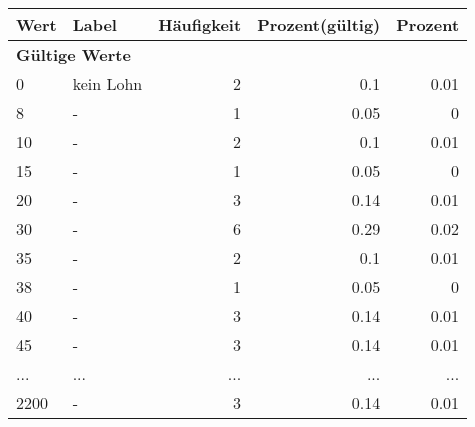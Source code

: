      \begin{longtable}{lXrrr}
     \toprule
     \textbf{Wert} & \textbf{Label} & \textbf{Häufigkeit} & \textbf{Prozent(gültig)} & \textbf{Prozent} \\
     \endhead
     \midrule
     \multicolumn{5}{l}{\textbf{Gültige Werte}}\\
        0 & \multicolumn{1}{X}{kein Lohn} & %
          \num{2} &
          \num[round-mode=places,round-precision=2]{0.1} &
          \num[round-mode=places,round-precision=2]{0.01} \\
        8 & \multicolumn{1}{X}{-} & %
          \num{1} &
          \num[round-mode=places,round-precision=2]{0.05} &
          \num[round-mode=places,round-precision=2]{0} \\
        10 & \multicolumn{1}{X}{-} & %
          \num{2} &
          \num[round-mode=places,round-precision=2]{0.1} &
          \num[round-mode=places,round-precision=2]{0.01} \\
        15 & \multicolumn{1}{X}{-} & %
          \num{1} &
          \num[round-mode=places,round-precision=2]{0.05} &
          \num[round-mode=places,round-precision=2]{0} \\
        20 & \multicolumn{1}{X}{-} & %
          \num{3} &
          \num[round-mode=places,round-precision=2]{0.14} &
          \num[round-mode=places,round-precision=2]{0.01} \\
        30 & \multicolumn{1}{X}{-} & %
          \num{6} &
          \num[round-mode=places,round-precision=2]{0.29} &
          \num[round-mode=places,round-precision=2]{0.02} \\
        35 & \multicolumn{1}{X}{-} & %
          \num{2} &
          \num[round-mode=places,round-precision=2]{0.1} &
          \num[round-mode=places,round-precision=2]{0.01} \\
        38 & \multicolumn{1}{X}{-} & %
          \num{1} &
          \num[round-mode=places,round-precision=2]{0.05} &
          \num[round-mode=places,round-precision=2]{0} \\
        40 & \multicolumn{1}{X}{-} & %
          \num{3} &
          \num[round-mode=places,round-precision=2]{0.14} &
          \num[round-mode=places,round-precision=2]{0.01} \\
        45 & \multicolumn{1}{X}{-} & %
          \num{3} &
          \num[round-mode=places,round-precision=2]{0.14} &
          \num[round-mode=places,round-precision=2]{0.01} \\
       ... & ... & ... & ... & ... \\
        2200 & \multicolumn{1}{X}{-} & %
          \num{3} &
          \num[round-mode=places,round-precision=2]{0.14} &
          \num[round-mode=places,round-precision=2]{0.01} \\


\end{longtable}
